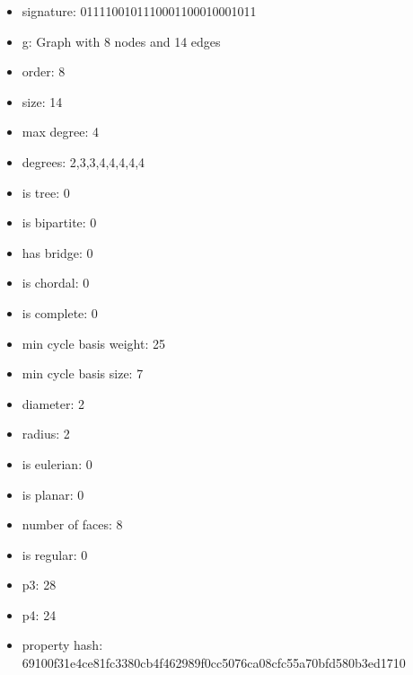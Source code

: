 \begin{itemize}
\item signature: 0111100101110001100010001011
\item g: Graph with 8 nodes and 14 edges
\item order: 8
\item size: 14
\item max degree: 4
\item degrees: 2,3,3,4,4,4,4,4
\item is tree: 0
\item is bipartite: 0
\item has bridge: 0
\item is chordal: 0
\item is complete: 0
\item min cycle basis weight: 25
\item min cycle basis size: 7
\item diameter: 2
\item radius: 2
\item is eulerian: 0
\item is planar: 0
\item number of faces: 8
\item is regular: 0
\item p3: 28
\item p4: 24
\item property hash: 69100f31e4ce81fc3380cb4f462989f0cc5076ca08cfc55a70bfd580b3ed1710
\end{itemize}
\newpage
\begin{figure}
\end{figure}
